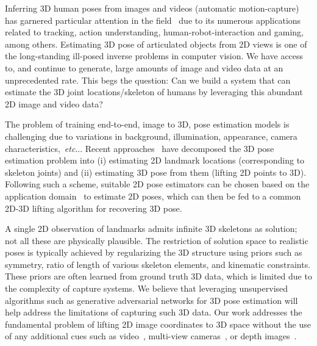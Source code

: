 \documentclass[runningheads]{llncs}
\makeatletter
\DeclareRobustCommand\onedot{\futurelet\@let@token\@onedot}
\def\@onedot{\ifx\@let@token.\else.\null\fi\xspace}
\def\etc{\emph{etc}\onedot} \def\vs{\emph{vs}\onedot}
\makeatother
\begin{document}
Inferring 3D human poses from images and videos (automatic motion-capture) has garnered particular attention in the field~\cite{hogg1983model,o1980model,forsyth2006computational,moeslund2001survey} due to its numerous applications related to tracking, action understanding, human-robot-interaction and gaming, among others. Estimating 3D pose of articulated objects from 2D views is one of the long-standing ill-posed inverse problems in computer vision. We have access to, and continue to generate, large amounts of image and video data at an unprecedented rate.
This begs the question: Can we build a system that can estimate the 3D joint locations/skeleton of humans by leveraging this abundant 2D image and video data?

The problem of training end-to-end, image to 3D, pose estimation models is challenging due to variations in background, illumination, appearance, camera characteristics,~\etc. Recent approaches~\cite{MartinezICCV2017,Moreno-Noguer_2017_CVPR} have decomposed the 3D pose estimation problem into (i) estimating 2D landmark locations (corresponding to skeleton joints) and (ii) estimating 3D pose from them ({lifting 2D points to 3D}). Following such a scheme, suitable 2D pose estimators can be chosen based on the application domain~\cite{cpm,stacked-hourglass,PartAffinityCVPR2017,mask-rcnn} to estimate 2D poses, which can then be fed to a common 2D-3D lifting algorithm for recovering 3D pose.

A single 2D observation of landmarks admits infinite 3D skeletons as solution; not all these are physically plausible. The restriction of solution space to realistic poses is typically achieved by regularizing the 3D structure using priors such as symmetry, ratio of length of various skeleton elements, and kinematic constraints. These priors are often learned from ground truth 3D data, which is limited due to the complexity of capture systems. We believe that leveraging unsupervised algorithms such as generative adversarial networks for 3D pose estimation will help address the limitations of capturing such 3D data. Our work addresses the fundamental problem of lifting 2D image coordinates to 3D space without the use of any additional cues such as video~\cite{Zhou_2016_CVPR,tekin2016direct}, multi-view cameras~\cite{amin2013multi,hofmann2012multi}, or depth images~\cite{rafi2015semantic,yub2015random,shotton2013real}.
\end{document}
